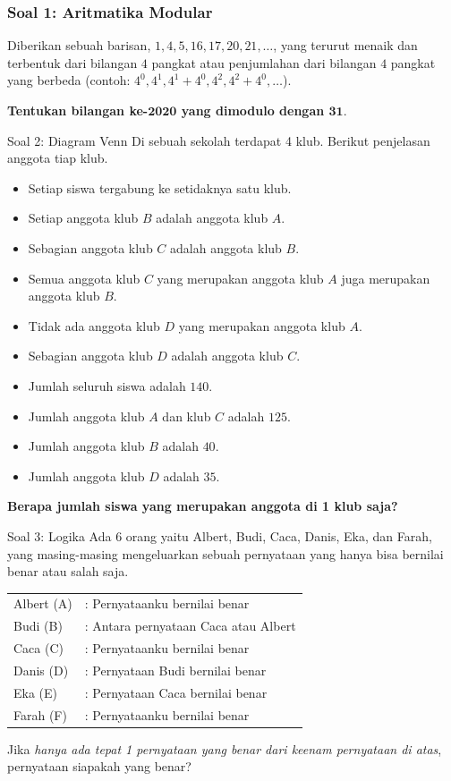\documentclass[english,t]{beamer}
\begin{document}
\begin{frame}
  \frametitle{Soal 1: Aritmatika Modular} 
Diberikan sebuah barisan, $1, 4, 5, 16, 17, 20, 21, \ldots$, yang terurut menaik dan terbentuk dari bilangan $4$ pangkat atau penjumlahan dari bilangan $4$ pangkat yang berbeda (contoh: $4^0, 4^1, 4^1 + 4^0, 4^2, 4^2 + 4^0, \ldots$).

\textbf{Tentukan bilangan ke-$\bm{2020}$ yang dimodulo dengan $\bm{31}$}.
\end{frame}


\begin{frame}{Soal 2: Diagram Venn}   
Di sebuah sekolah terdapat 4 klub. Berikut penjelasan anggota tiap klub.
\begin{itemize}
	\item Setiap siswa tergabung ke setidaknya satu klub.
	\item Setiap anggota klub $B$ adalah anggota klub $A$.
	\item Sebagian anggota klub $C$ adalah anggota klub $B$.
	\item Semua anggota klub $C$ yang merupakan anggota klub $A$ juga merupakan anggota klub $B$.
	\item Tidak ada anggota klub $D$ yang merupakan anggota klub $A$.
	\item Sebagian anggota klub $D$ adalah anggota klub $C$.
	\item Jumlah seluruh siswa adalah $140$.
	\item Jumlah anggota klub $A$ dan klub $C$ adalah $125$.
	\item Jumlah anggota klub $B$ adalah $40$.
	\item Jumlah anggota klub $D$ adalah $35$.
\end{itemize}
 \textbf{Berapa jumlah siswa yang merupakan anggota di 1 klub saja?}
\end{frame}

\begin{frame}{Soal 3: Logika}
Ada 6 orang yaitu Albert, Budi, Caca, Danis, Eka, dan Farah, yang masing-masing mengeluarkan sebuah pernyataan yang hanya bisa bernilai benar atau salah saja.

\bigskip
\begin{tabular}{ll}
Albert (A) &: Pernyataanku bernilai benar \\
Budi (B)   &: Antara pernyataan Caca atau Albert \\
Caca (C)   &: Pernyataanku bernilai benar \\
Danis (D)  &: Pernyataan Budi bernilai benar \\
Eka (E)    &: Pernyataan Caca bernilai benar \\
Farah (F)  &: Pernyataanku bernilai benar
\end{tabular} 

\bigskip
Jika \textit{hanya ada tepat 1 pernyataan yang benar dari keenam pernyataan di atas}, pernyataan siapakah yang benar?
\end{frame}
\end{document}
